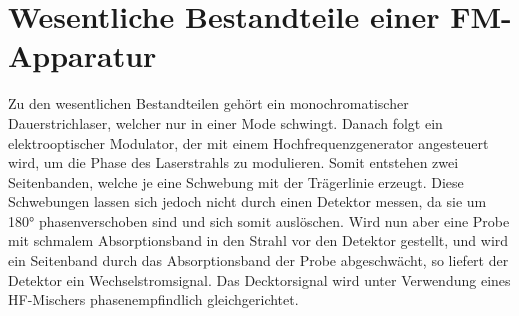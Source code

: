 
\section{Wesentliche Bestandteile einer FM-Apparatur}

Zu den wesentlichen Bestandteilen gehört ein monochromatischer Dauerstrichlaser, welcher nur in einer Mode schwingt. Danach folgt ein elektrooptischer Modulator, der mit einem Hochfrequenzgenerator angesteuert wird, um die Phase des Laserstrahls zu modulieren. Somit entstehen zwei Seitenbanden, welche je eine Schwebung mit der Trägerlinie erzeugt. Diese Schwebungen lassen sich jedoch nicht durch einen Detektor messen, da sie um 180° phasenverschoben sind und sich somit auslöschen. Wird nun aber eine Probe mit schmalem Absorptionsband in den Strahl vor den Detektor gestellt, und wird ein Seitenband durch das Absorptionsband der Probe abgeschwächt, so liefert der Detektor ein Wechselstromsignal. Das Decktorsignal wird unter Verwendung eines HF-Mischers phasenempfindlich gleichgerichtet.